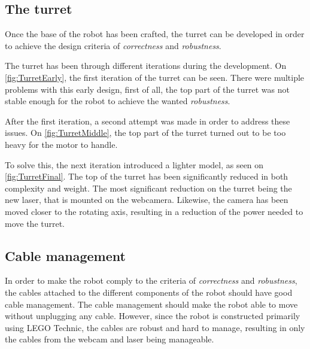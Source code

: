 \subsection{The turret}
Once the base of the robot has been crafted, the turret can be developed in order to achieve the design criteria of \textit{correctness} and \textit{robustness}. 

The turret has been through different iterations during the development. 
On \autoref{fig:TurretEarly}, the first iteration of the turret can be seen.
There were multiple problems with this early design, first of all, the top part of the turret was not stable enough for the robot to achieve the wanted \textit{robustness}.

After the first iteration, a second attempt was made in order to address these issues. 
On \autoref{fig:TurretMiddle}, the top part of the turret turned out to be too heavy for the motor to handle. 

To solve this, the next iteration introduced a lighter model, as seen on \autoref{fig:TurretFinal}.
The top of the turret has been significantly reduced in both complexity and weight. 
The most significant reduction on the turret being the new laser, that is mounted on the webcamera.
Likewise, the camera has been moved closer to the rotating axis, resulting in a reduction of the power needed to move the turret. 

\subsection{Cable management}
In order to make the robot comply to the criteria of \textit{correctness} and \textit{robustness}, the cables attached to the different components of the robot should have good cable management. 
The cable management should make the robot able to move without unplugging any cable.
However, since the robot is constructed primarily using LEGO Technic, the cables are robust and hard to manage, resulting in only the cables from the webcam and laser being manageable. 
